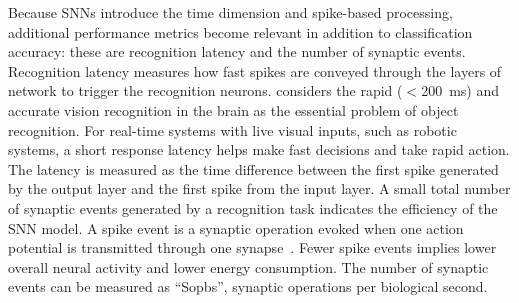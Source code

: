 \documentclass{frontiersENG} %
\begin{document}
Because SNNs introduce the time dimension and spike-based processing, additional performance metrics become relevant in addition to classification accuracy: these are recognition latency and the number of synaptic events.
Recognition latency measures how fast spikes are conveyed through the layers of network to trigger the recognition neurons.
\cite{dicarlo2012does} considers the rapid ($<$200~ms) and accurate vision recognition in the brain as the essential problem of object recognition.
For real-time systems with live visual inputs, such as robotic systems, a short response latency helps make fast decisions and take rapid action.
The latency is measured as the time difference between the first spike generated by the output layer and the first spike from the input layer.
A small total number of synaptic events generated by a recognition task indicates the efficiency of the SNN model.
A spike event is a synaptic operation evoked when one action potential is transmitted through one synapse~\citep{sharp2012power}.
Fewer spike events implies lower overall neural activity and lower energy consumption.
The number of synaptic events can be measured as ``Sopbs'', synaptic operations per biological second.
\end{document}
